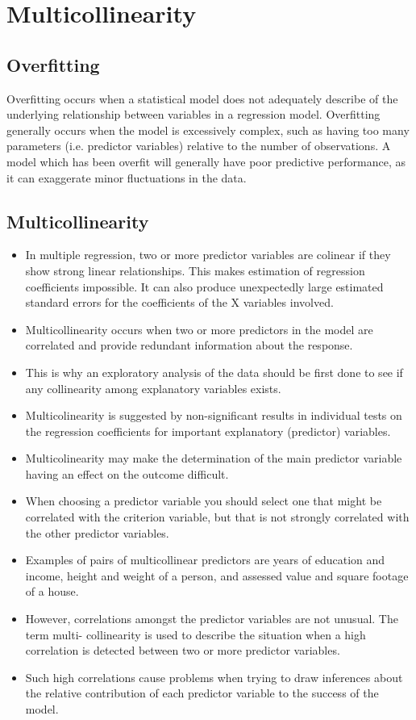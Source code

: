 \documentclass[a4paper,12pt]{article}
\begin{document}
\section{Multicollinearity}
\subsection{Overfitting}
Overfitting occurs when a statistical model does not adequately describe of the underlying
relationship between variables in a regression model. Overfitting generally occurs when the
model is excessively complex, such as having too many parameters (i.e. predictor variables)
relative to the number of observations. A model which has been overfit will generally have poor
predictive performance, as it can exaggerate minor fluctuations in the data.





\subsection{Multicollinearity}
\begin{itemize}
	\item In multiple regression, two or more predictor variables are colinear if they show strong
	linear relationships. This makes estimation of regression coefficients impossible. It can
	also produce unexpectedly large estimated standard errors for the coefficients of the X
	variables involved.
	\item Multicollinearity occurs when two or more predictors in the model are correlated
	and provide redundant information about the response.
	\item This is why an exploratory analysis of the data should be first done to see if any collinearity
	among explanatory variables exists.
	\item Multicolinearity is suggested by non-significant results in individual tests on the regression
	coefficients for important explanatory (predictor) variables.
	\item Multicolinearity may make the determination of the main predictor variable having an
	effect on the outcome difficult.
	\item When choosing a predictor variable you should select one that might be correlated with
	the criterion variable, but that is not strongly correlated with the other predictor variables.
	\item  Examples of pairs of multicollinear predictors are years of education and income, height and weight of a
	person, and assessed value and square footage of a house.
	\item However, correlations amongst the predictor variables are not unusual. The term multi-
	collinearity is used to describe the situation when a high correlation is detected between
	two or more predictor variables.
	\item Such high correlations cause problems when trying to draw inferences about the relative
	contribution of each predictor variable to the success of the model.
\end{itemize}
\end{document}

